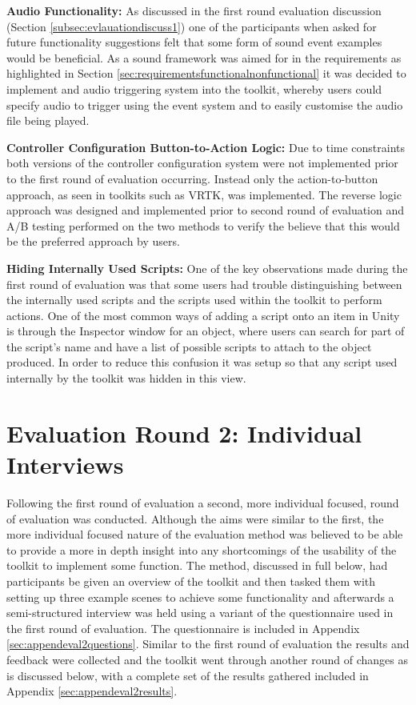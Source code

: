 \documentclass{l4proj}
\begin{document}
\textbf{Audio Functionality:} As discussed in the first round evaluation discussion (Section \ref{subsec:evlauationdiscuss1}) one of the participants when asked for future functionality suggestions felt that some form of sound event examples would be beneficial. As a sound framework was aimed for in the requirements as highlighted in Section \ref{sec:requirementsfunctionalnonfunctional} it was decided to implement and audio triggering system into the toolkit, whereby users could specify audio to trigger using the event system and to easily customise the audio file being played. 

\textbf{Controller Configuration Button-to-Action Logic:} Due to time constraints both versions of the controller configuration system were not implemented prior to the first round of evaluation occurring. Instead only the action-to-button approach, as seen in toolkits such as VRTK, was implemented. The reverse logic approach was designed and implemented prior to second round of evaluation and A/B testing performed on the two methods to verify the believe that this would be the preferred approach by users. 

\textbf{Hiding Internally Used Scripts:} One of the key observations made during the first round of evaluation was that some users had trouble distinguishing between the internally used scripts and the scripts used within the toolkit to perform actions. One of the most common ways of adding a script onto an item in Unity is through the Inspector window for an object, where users can search for part of the script’s name and have a list of possible scripts to attach to the object produced. In order to reduce this confusion it was setup so that any script used internally by the toolkit was hidden in this view. 

\section{Evaluation Round 2: Individual Interviews}
\label{sec:evaluationround2}
Following the first round of evaluation a second, more individual focused, round of evaluation was conducted. Although the aims were similar to the first, the more individual focused nature of the evaluation method was believed to be able to provide a more in depth insight into any shortcomings of the usability of the toolkit to implement some function. The method, discussed in full below, had participants be given an overview of the toolkit and then tasked them with setting up three example scenes to achieve some functionality and afterwards a semi-structured interview was held using a variant of the questionnaire used in the first round of evaluation. The questionnaire is included in Appendix \ref{sec:appendeval2questions}. Similar to the first round of evaluation the results and feedback were collected and the toolkit went through another round of changes as is discussed below, with a complete set of the results gathered included in Appendix \ref{sec:appendeval2results}.
\end{document}
